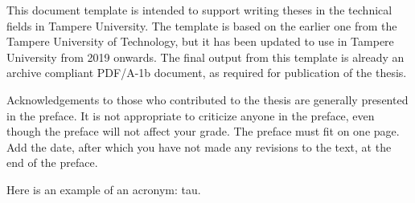 This document template is intended to support writing theses in the technical fields in Tampere University. The template is based on the earlier one from the Tampere University of Technology, but it has been updated to use in Tampere University from 2019 onwards. The final output from this template is already an archive compliant PDF/A-1b document, as required for publication of the thesis.

Acknowledgements to those who contributed to the thesis are generally presented in the preface. It is not appropriate to criticize anyone in the preface, even though the preface will not affect your grade. The preface must fit on one page. Add the date, after which you have not made any revisions to the text, at the end of the preface.

Here is an example of an acronym: \gls{tau}.
